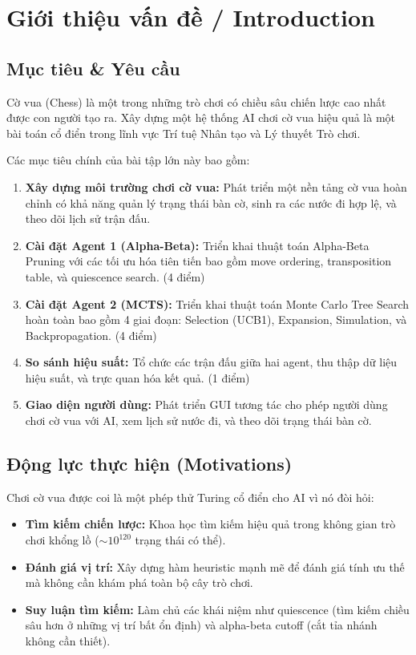 \section{Giới thiệu vấn đề / Introduction}

\subsection{Mục tiêu \& Yêu cầu}
Cờ vua (Chess) là một trong những trò chơi có chiều sâu chiến lược cao nhất được con người tạo ra. Xây dựng một hệ thống AI chơi cờ vua hiệu quả là một bài toán cổ điển trong lĩnh vực Trí tuệ Nhân tạo và Lý thuyết Trò chơi.

Các mục tiêu chính của bài tập lớn này bao gồm:
\begin{enumerate}
    \item \textbf{Xây dựng môi trường chơi cờ vua:} Phát triển một nền tảng cờ vua hoàn chỉnh có khả năng quản lý trạng thái bàn cờ, sinh ra các nước đi hợp lệ, và theo dõi lịch sử trận đấu.
    \item \textbf{Cài đặt Agent 1 (Alpha-Beta):} Triển khai thuật toán Alpha-Beta Pruning với các tối ưu hóa tiên tiến bao gồm move ordering, transposition table, và quiescence search. (4 điểm)
    \item \textbf{Cài đặt Agent 2 (MCTS):} Triển khai thuật toán Monte Carlo Tree Search hoàn toàn bao gồm 4 giai đoạn: Selection (UCB1), Expansion, Simulation, và Backpropagation. (4 điểm)
    \item \textbf{So sánh hiệu suất:} Tổ chức các trận đấu giữa hai agent, thu thập dữ liệu hiệu suất, và trực quan hóa kết quả. (1 điểm)
    \item \textbf{Giao diện người dùng:} Phát triển GUI tương tác cho phép người dùng chơi cờ vua với AI, xem lịch sử nước đi, và theo dõi trạng thái bàn cờ.
\end{enumerate}

\subsection{Động lực thực hiện (Motivations)}
Chơi cờ vua được coi là một phép thử Turing cổ điển cho AI vì nó đòi hỏi:
\begin{itemize}
    \item \textbf{Tìm kiếm chiến lược:} Khoa học tìm kiếm hiệu quả trong không gian trò chơi khổng lồ ($\sim 10^{120}$ trạng thái có thể).
    \item \textbf{Đánh giá vị trí:} Xây dựng hàm heuristic mạnh mẽ để đánh giá tính ưu thế mà không cần khám phá toàn bộ cây trò chơi.
    \item \textbf{Suy luận tìm kiếm:} Làm chủ các khái niệm như quiescence (tìm kiếm chiều sâu hơn ở những vị trí bất ổn định) và alpha-beta cutoff (cắt tỉa nhánh không cần thiết).
\end{itemize}

